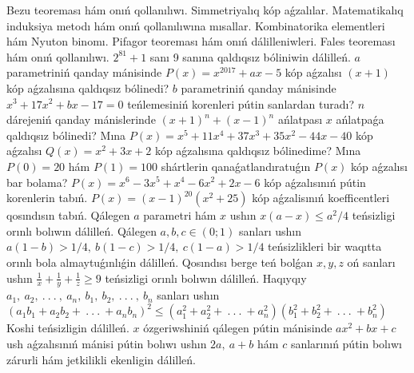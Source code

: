 Bezu teoreması hám onıń qollanılıwı.
Simmetriyalıq kóp aǵzalılar.
Matematikalıq induksiya metodı hám onıń qollanılıwına mısallar.
Kombinatorika elementleri hám Nyuton binomı.
Pifagor teoreması hám onıń dálilleniwleri.
Fales teoreması hám onıń qollanılıwı.
\(2^{81} + 1\) sanı 9 sanına qaldıqsız bóliniwin dálilleń.
\(a\) parametriniń qanday mánisinde \(P(x) = x^{2017} + ax - 5\) kóp aǵzalısı \((x + 1)\) kóp aǵzalısına qaldıqsız bólinedi?
\(b\) parametriniń qanday mánisinde \(x^{3} + 17x^{2} + bx - 17 = 0\) teńlemesiniń korenleri pútin sanlardan turadı?
\(n\) dárejeniń qanday mánislerinde \((x + 1)^{n} + (x - 1)^{n}\) ańlatpası \(x\) ańlatpaǵa qaldıqsız bólinedi?
Mına \(P(x) = x^{5} + 11x^{4} + 37x^{3} + 35x^{2} - 44x - 40\) kóp aǵzalısı \(Q(x) = x^{2} + 3x + 2\) kóp aǵzalısına qaldıqsız bólinedime?
Mına \(P(0) = 20\) hám \(P(1) = 100\) shártlerin qanaǵatlandıratuǵın \(P(x)\) kóp aǵzalısı bar bolama?
\(P(x) = x^{6} - 3x^{5} + x^{4} - 6x^{2} + 2x - 6\) kóp aǵzalısınıń pútin korenlerin tabıń.
\(P(x) = (x - 1)^{20}\left( x^{2} + 25 \right)\) kóp aǵzalisınıń koefficentleri qosındısın tabıń.
Qálegen \(a\) parametri hám \(x\) ushın \(x(a - x) \leq a^{2}/4\) teńsizligi orınlı bolıwın dálilleń.
Qálegen \(a,b,c \in (0;1)\) sanları ushın \(a(1 - b) > 1/4,\ b(1 - c) > 1/4,\ c(1 - a) > 1/4\) teńsizlikleri bir waqıtta orınlı bola almaytuǵınlıǵin dálilleń.
Qosındısı berge teń bolǵan \(x,y,z\) oń sanları ushın \(\frac{1}{x} + \frac{1}{y} + \frac{1}{z} \geq 9\) teńsizligi orınlı bolıwın dálilleń.
Haqıyqıy \(a_{1},\ a_{2},\ .\ .\ .\ ,\ a_{n},\ b_{1},\ b_{2},\ .\ .\ .\ ,\ b_{n}\) sanları ushın \(\left( a_{1}b_{1} + a_{2}b_{2} + \ .\ .\ .\  + a_{n}b_{n} \right)^{2} \leq \left( a_{1}^{2} + a_{2}^{2} + \ .\ .\ .\  + a_{n}^{2} \right)\left( b_{1}^{2} + b_{2}^{2} + \ .\ .\ .\  + b_{n}^{2} \right)\) Koshi teńsizligin dálilleń.
\(x\) ózgeriwshiniń qálegen pútin mánisinde \(ax^{2} + bx + c\) ush aǵzalısınıń mánisi pútin bolıwı ushın \(2a,\ a + b\) hám \(c\) sanlarınıń pútin bolıwı zárurli hám jetkilikli ekenligin dálilleń.
